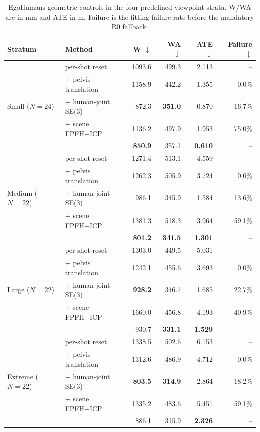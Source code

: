 \begin{table}[t]
  \centering
  \caption{EgoHumans geometric controls in the four predefined viewpoint
  strata. W/WA are in mm and ATE in m. Failure is the fitting-failure rate
  before the mandatory R0 fallback.}
  \label{tab:supp-registration-angle-eh}
  \supptablesize
  \setlength{\tabcolsep}{2.9pt}
  \begin{tabular}{llrrrr}
    \toprule
    Stratum & Method & W $\downarrow$ & WA $\downarrow$ & ATE $\downarrow$ & Failure $\downarrow$ \\
    \midrule
    \multirow{5}{*}{Small ($N=24$)}
      & \humanthree{} per-shot reset & 1093.6 & 499.3 & 2.113 & -- \\
      & $+$ pelvis translation & 1158.9 & 442.2 & 1.355 & 0.0\% \\
      & $+$ human-joint SE(3) & 872.3 & \textbf{351.0} & 0.870 & 16.7\% \\
      & $+$ scene FPFH+ICP & 1136.2 & 497.9 & 1.953 & 75.0\% \\
      & \method{} & \textbf{850.9} & 357.1 & \textbf{0.610} & -- \\
    \midrule
    \multirow{5}{*}{Medium ($N=22$)}
      & \humanthree{} per-shot reset & 1271.4 & 513.1 & 4.559 & -- \\
      & $+$ pelvis translation & 1262.3 & 505.9 & 3.724 & 0.0\% \\
      & $+$ human-joint SE(3) & 986.1 & 345.9 & 1.584 & 13.6\% \\
      & $+$ scene FPFH+ICP & 1381.3 & 518.3 & 3.964 & 59.1\% \\
      & \method{} & \textbf{801.2} & \textbf{341.5} & \textbf{1.301} & -- \\
    \midrule
    \multirow{5}{*}{Large ($N=22$)}
      & \humanthree{} per-shot reset & 1303.0 & 449.5 & 5.031 & -- \\
      & $+$ pelvis translation & 1242.1 & 455.6 & 3.693 & 0.0\% \\
      & $+$ human-joint SE(3) & \textbf{928.2} & 346.7 & 1.685 & 22.7\% \\
      & $+$ scene FPFH+ICP & 1660.0 & 456.8 & 4.193 & 40.9\% \\
      & \method{} & 930.7 & \textbf{331.1} & \textbf{1.529} & -- \\
    \midrule
    \multirow{5}{*}{Extreme ($N=22$)}
      & \humanthree{} per-shot reset & 1338.5 & 502.6 & 6.153 & -- \\
      & $+$ pelvis translation & 1312.6 & 486.9 & 4.712 & 0.0\% \\
      & $+$ human-joint SE(3) & \textbf{803.5} & \textbf{314.9} & 2.864 & 18.2\% \\
      & $+$ scene FPFH+ICP & 1335.2 & 483.6 & 5.451 & 59.1\% \\
      & \method{} & 886.1 & 315.9 & \textbf{2.326} & -- \\
    \bottomrule
  \end{tabular}
\end{table}
